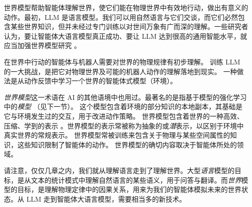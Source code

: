 世界模型帮助智能体理解世界，使它们能在物理世界中有效地行动，做出有意义的动作。最初，LLM 是语言模型。我们可以用自然语言与它们交谈，而它们必然包含某些世界知识，但并未经过专门训练以对世间万象有广而深的理解。一些研究者认为，要让智能体大语言模型真正成功、要让 LLM 达到很高的通用智能水平，就应当加强世界模型研究 \citep{sutton2022alberta,matsuo2022deep,lecun2022path,klindt2026does}。




在世界中行动的智能体与机器人需要对世界的物理规律有初步理解。
训练 LLM 的一大挑战，是把它对物理世界及可能的机器人动作的理解落地到现实。
一种做法是从动作反馈中学习一个世界的智能体式模型（环境）。

{\em 世界模型}这一术语在 AI 的其他语境中也用过。最著名的是指基于模型的强化学习中的{\em 模型} \citep{ha2018world,moerland2023model,sutton1991dyna}（见下一节）。%
这个模型包含着环境的部分知识的本地副本，其基础是它与环境发生过的交互，用于改进动作策略。
世界模型包含着世界的一种高效、压缩、学到的表示 \citep{hafner2018learning,plaat2020deep}。世界模型的表示常被称为抽象的或{\em 潜}表示，以区别于环境中真实世界的常规表示。
世界模型常被训练来包含关于物理与某些空间属性的知识，这些知识限制了智能体的动作。%
世界模型的确切内容取决于智能体所处的领域。




请注意，仅仅几章之内，我们就从理解语言走到了理解世界。大型{\em 语言}模型的目标，是从文本的统计模式中理解自然语言的某些语义，用于问答与翻译。而{\em 世界}模型的目标，是理解物理定律中的因果关系，用来为我们的智能体模拟未来的世界状态。从 LLM 走到智能体大语言模型，需要相当多的新技术。


